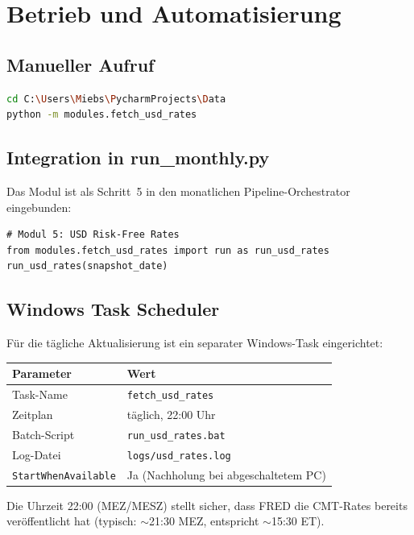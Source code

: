 \documentclass[11pt, a4paper]{article}
\begin{document}
\section{Betrieb und Automatisierung}

\subsection{Manueller Aufruf}

\begin{lstlisting}[language=bash]
cd C:\Users\Miebs\PycharmProjects\Data
python -m modules.fetch_usd_rates
\end{lstlisting}

\subsection{Integration in run\_monthly.py}

Das Modul ist als Schritt~5 in den monatlichen Pipeline-Orchestrator
eingebunden:

\begin{lstlisting}
# Modul 5: USD Risk-Free Rates
from modules.fetch_usd_rates import run as run_usd_rates
run_usd_rates(snapshot_date)
\end{lstlisting}

\subsection{Windows Task Scheduler}

Für die tägliche Aktualisierung ist ein separater Windows-Task
eingerichtet:

\begin{tabular}{ll}
  \toprule
  Parameter & Wert \\
  \midrule
  Task-Name          & \texttt{fetch\_usd\_rates} \\
  Zeitplan           & täglich, 22:00 Uhr \\
  Batch-Script       & \texttt{run\_usd\_rates.bat} \\
  Log-Datei          & \texttt{logs/usd\_rates.log} \\
  \texttt{StartWhenAvailable} & Ja (Nachholung bei abgeschaltetem PC) \\
  \bottomrule
\end{tabular}

Die Uhrzeit 22:00 (MEZ/MESZ) stellt sicher, dass FRED die
CMT-Rates bereits veröffentlicht hat (typisch: $\sim$21:30 MEZ,
entspricht $\sim$15:30 ET).
\end{document}
